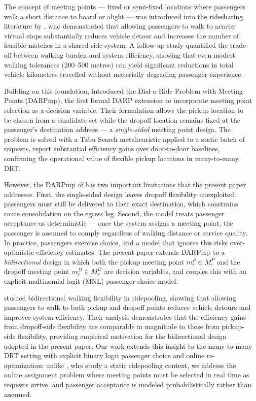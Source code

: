 The concept of meeting points — fixed or semi-fixed locations where passengers walk a short distance to board or alight — was introduced into the ridesharing literature by \citet{stiglic2015}, who demonstrated that allowing passengers to walk to nearby virtual stops substantially reduces vehicle detour and increases the number of feasible matches in a shared-ride system. A follow-up study \citep{stiglic2018} quantified the trade-off between walking burden and system efficiency, showing that even modest walking tolerances (200--500 metres) can yield significant reductions in total vehicle kilometres travelled without materially degrading passenger experience.

Building on this foundation, \citet{cortenbach2024} introduced the Dial-a-Ride Problem with Meeting Points (DARPmp), the first formal DARP extension to incorporate meeting point selection as a decision variable. Their formulation allows the pickup location to be chosen from a candidate set while the dropoff location remains fixed at the passenger's destination address — a \emph{single-sided} meeting point design. The problem is solved with a Tabu Search metaheuristic applied to a static batch of requests. \citet{cortenbach2024} report substantial efficiency gains over door-to-door baselines, confirming the operational value of flexible pickup locations in many-to-many DRT.

However, the DARPmp of \citet{cortenbach2024} has two important limitations that the present paper addresses. First, the single-sided design leaves dropoff flexibility unexploited: passengers must still be delivered to their exact destination, which constrains route consolidation on the egress leg. Second, the model treats passenger acceptance as deterministic — once the system assigns a meeting point, the passenger is assumed to comply regardless of walking distance or service quality. In practice, passengers exercise choice, and a model that ignores this risks over-optimistic efficiency estimates. The present paper extends DARPmp to a \emph{bidirectional} design in which both the pickup meeting point $m_r^P \in M_r^P$ and the dropoff meeting point $m_r^D \in M_r^D$ are decision variables, and couples this with an explicit multinomial logit (MNL) passenger choice model.

\citet{fielbaum2021} studied bidirectional walking flexibility in ridepooling, showing
that allowing passengers to walk to both pickup and dropoff points reduces vehicle detours
and improves system efficiency. Their analysis demonstrates that the efficiency gains from
dropoff-side flexibility are comparable in magnitude to those from pickup-side flexibility,
providing empirical motivation for the bidirectional design adopted in the present paper.
Our work extends this insight to the many-to-many DRT setting with explicit binary logit passenger
choice and online re-optimization: unlike \citet{fielbaum2021}, who study a static
ridepooling context, we address the online assignment problem where meeting points must be
selected in real time as requests arrive, and passenger acceptance is modeled
probabilistically rather than assumed.

